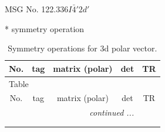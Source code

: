 \documentclass[fleqn,8pt]{jsarticle}
\begin{document}
\setcounter{MaxMatrixCols}{32}

\renewcommand{\tablename}{Table~}
\renewcommand{\figurename}{Figure~}
\begin{center}
\LARGE
MSG No. 122.336\quad$I\bar{4}'2d'$
\end{center}
* symmetry operation
\renewcommand{\arraystretch}{1.3}
\begin{longtable}{ccccc}
\caption{Symmetry operations for 3d polar vector.}
 \\
 \hline \hline
No. & tag & matrix (polar) & det & TR \\ \hline \endfirsthead

\multicolumn{4}{l}{\tablename\ \thetable{}} \\
 \hline \hline
No. & tag & matrix (polar) & det & TR \\ \hline \endhead

 \hline \hline
\multicolumn{4}{r}{\footnotesize\it continued ...} \\ \endfoot

 \hline \hline
\multicolumn{4}{r}{} \\ \endlastfoot


\end{longtable}
\end{document}
